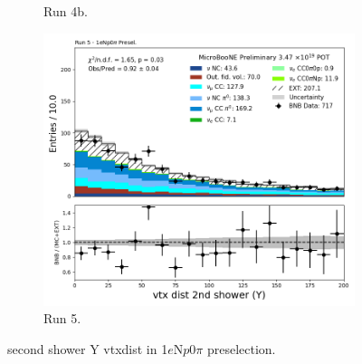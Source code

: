 \begin{figure}[H]
\begin{subfigure}[t]{0.32\linewidth}
        \caption{Run 4b.}
    \end{subfigure}%
    \hspace{0.2cm}%
    \begin{subfigure}[t]{0.32\linewidth}
        \includegraphics[width=\linewidth]{technote/Appendix_Preselection/Figures/1eNp0pi/Run5/secondshower_Y_vtxdist_Run5_1eNp0pi_Presel.png}
        \caption{Run 5.}
    \end{subfigure}
    \caption{second shower Y vtxdist in 1$e$N$p$0$\pi$ preselection.}
\end{figure}

